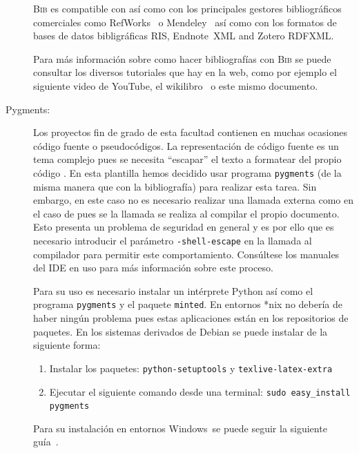 \documentclass{DeustoFDP}
\begin{document}
\begin{description}
    \textsc{Bib} es compatible con  as\'i como con los
    principales gestores bibliogr\'aficos co\-mer\-cia\-les como
    RefWorks\textregistered~\cite{refworks} o
    Mendeley\textregistered~\cite{mendeley} as\'i como con los formatos
    de bases de datos bibligr\'aficas RIS, Endnote\texttrademark\ XML and
    Zotero RDFXML.

    Para m\'as informaci\'on sobre como hacer bibliograf\'ias con
    \textsc{Bib} se puede consultar los diversos tutoriales que hay en la
    web, como por ejemplo el siguiente video \cite{youtube} de YouTube\textregistered,
    el wikilibro~\cite{wikilibro} o este mismo documento.

  \item[Pygments:] Los proyectos fin de grado de esta facultad contienen
    en muchas ocasiones c\'odigo fuente o pseudoc\'odigos. La representaci\'on
    de c\'odigo fuente es un tema complejo pues se necesita \enquote{escapar}
    el texto a formatear del propio c\'odigo . En esta plantilla
    hemos decidido usar programa \texttt{pygments} (de la misma manera que con
    la bibliograf\'ia) para realizar esta tarea.  Sin embargo, en este caso no
    es necesario realizar una llamada externa como en el caso de 
    pues se la llamada se realiza al compilar el propio documento. Esto presenta
    un problema de seguridad en general y es por ello que es necesario introducir
    el par\'ametro \verb+-shell-escape+ en la llamada al compilador para permitir
    este comportamiento. Cons\'ultese los manuales del IDE en uso para m\'as
    informaci\'on sobre este proceso.

    Para su uso es necesario instalar un int\'erprete Python as\'i como el
    programa \texttt{pygments} y el paquete \texttt{minted}. En entornos *nix
    no deber\'ia de haber ning\'un problema pues estas aplicaciones est\'an
    en los repositorios de paquetes. En los sistemas derivados de Debian se puede
    instalar de la siguiente forma:
    \begin{enumerate}
      \item Instalar los paquetes: \texttt{python-setuptools} y \texttt{texlive-latex-extra}
      \item Ejecutar el siguiente comando desde una terminal: \texttt{sudo easy\_install pygments}
    \end{enumerate}

    Para su instalaci\'on en entornos Windows\texttrademark\ se puede seguir la
    siguiente gu\'ia~\cite{pygments}.


\end{description}
\end{document}
